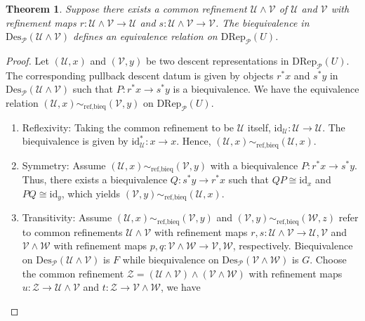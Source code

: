 \documentclass[reqno]{amsart}
\newtheorem{theorem}[formula]{Theorem}
\theoremstyle{definition}
\theoremstyle{remark}
\begin{document}
\begin{theorem}\label{theorem:modulo equivalence relation}
    Suppose there exists a common refinement $\mathcal{U} \wedge \mathcal{V}$ of $\mathcal{U}$ and $\mathcal{V}$ with refinement maps $r:\mathcal{U} \wedge \mathcal{V} \longrightarrow \mathcal{U}$ and $s:\mathcal{U} \wedge \mathcal{V} \longrightarrow \mathcal{V}$. The biequivalence in $\text{Des}_\mathscr{P}(\mathcal{U} \wedge \mathcal{V})$ defines an equivalence relation on $\text{DRep}_\mathscr{P}(U)$.
\end{theorem}
\begin{proof}
    Let $(\mathcal{U},x)$ and $(\mathcal{V},y)$ be two descent representations in $\text{DRep}_\mathscr{P}(U)$. The corresponding pullback descent datum is given by objects $r^*x$ and $s^*y$ in $\text{Des}_\mathscr{P}(\mathcal{U} \wedge \mathcal{V})$ such that $P:r^*x\longrightarrow s^*y$ is a biequivalence. We have the equivalence relation $(\mathcal{U},x) \sim_{\text{ref,bieq}} (\mathcal{V},y)$ on $\text{DRep}_\mathscr{P}(U)$.
    \begin{enumerate}
        \item Reflexivity: Taking the common refinement to be $\mathcal{U}$ itself, $\text{id}_\mathcal{U}:\mathcal{U} \longrightarrow \mathcal{U}$. The biequivalence is given by $\text{id}^*_\mathcal{U}: x \longrightarrow x$. Hence, $(\mathcal{U},x) \sim_{\text{ref,bieq}} (\mathcal{U},x)$.
        \item Symmetry: Assume $(\mathcal{U},x) \sim_{\text{ref,bieq}} (\mathcal{V},y)$ with a biequivalence $P:r^* x \longrightarrow s^*y$. Thus, there exists a biequivalence $Q:s^*y \longrightarrow r^*x$ such that $QP \cong \text{id}_x$ and $PQ \cong \text{id}_y$, which yields $(\mathcal{V},y)\sim_{\text{ref,bieq}} (\mathcal{U},x)$.
        \item Transitivity: Assume $(\mathcal{U},x) \sim_{\text{ref,bieq}} (\mathcal{V},y)$ and $(\mathcal{V},y) \sim_{\text{ref,bieq}} (\mathcal{W},z)$ refer to common refinements $\mathcal{U} \wedge \mathcal{V}$ with refinement maps $r,s:\mathcal{U} \wedge \mathcal{V}\longrightarrow \mathcal{U},\mathcal{V}$ and $\mathcal{V}\wedge \mathcal{W}$ with refinement maps $p,q:\mathcal{V} \wedge \mathcal{W}\longrightarrow \mathcal{V},\mathcal{W}$, respectively. Biequivalence on $\text{Des}_\mathscr{P}(\mathcal{U} \wedge \mathcal{V})$ is $F$ while biequivalence on $\text{Des}_\mathscr{P}(\mathcal{V} \wedge \mathcal{W})$ is $G$. Choose the common refinement $\mathcal{Z}=(\mathcal{U} \wedge \mathcal{V})\wedge (\mathcal{V} \wedge \mathcal{W})$ with refinement maps $u:\mathcal{Z} \longrightarrow \mathcal{U} \wedge \mathcal{V}$ and $t:\mathcal{Z} \longrightarrow \mathcal{V} \wedge \mathcal{W}$, we have

\end{enumerate}
\end{proof}
\end{document}
